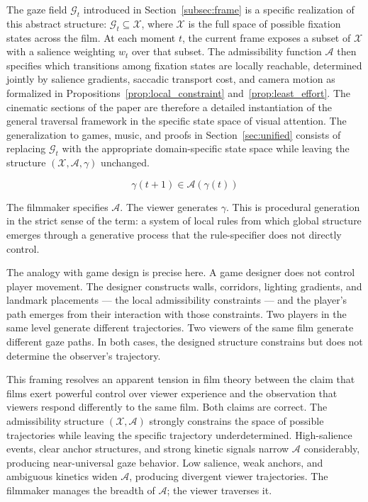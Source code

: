 \documentclass[12pt, a4paper]{article}
\theoremstyle{plain}
\theoremstyle{definition}
\theoremstyle{remark}
\newcommand{\X}{\mathcal{X}}
\newcommand{\A}{\mathcal{A}}
\newcommand{\G}{\mathcal{G}}
\newcommand{\traj}{\gamma}
\newcommand{\salience}{w}
\begin{document}
The gaze field $\G_t$ introduced in
Section~\ref{subsec:frame} is a specific realization of
this abstract structure: $\G_t \subseteq \X$, where $\X$ is
the full space of possible fixation states across the film.
At each moment $t$, the current frame exposes a subset of
$\X$ with a salience weighting $\salience_t$ over that
subset. The admissibility function $\A$ then specifies which
transitions among fixation states are locally reachable,
determined jointly by salience gradients, saccadic transport
cost, and camera motion as formalized in
Propositions~\ref{prop:local_constraint}
and~\ref{prop:least_effort}. The cinematic sections of the
paper are therefore a detailed instantiation of the general
traversal framework in the specific state space of visual
attention. The generalization to games, music, and proofs
in Section~\ref{sec:unified} consists of replacing $\G_t$
with the appropriate domain-specific state space while
leaving the structure $(\X, \A, \traj)$ unchanged.

\begin{equation}
  \traj(t+1) \in \A(\traj(t))
  \label{eq:trajectory_generation}
\end{equation}

The filmmaker specifies $\A$. The viewer generates $\traj$.
This is procedural generation in the strict sense of the
term: a system of local rules from which global structure
emerges through a generative process that the rule-specifier
does not directly control.

The analogy with game design is precise here. A game designer
does not control player movement. The designer constructs
walls, corridors, lighting gradients, and landmark
placements --- the local admissibility constraints --- and
the player's path emerges from their interaction with those
constraints. Two players in the same level generate
different trajectories. Two viewers of the same film generate
different gaze paths. In both cases, the designed structure
constrains but does not determine the observer's trajectory.

This framing resolves an apparent tension in film theory
between the claim that films exert powerful control over
viewer experience and the observation that viewers respond
differently to the same film. Both claims are correct. The
admissibility structure $(\X, \A)$ strongly constrains the
space of possible trajectories while leaving the specific
trajectory underdetermined. High-salience events, clear
anchor structures, and strong kinetic signals narrow $\A$
considerably, producing near-universal gaze behavior. Low
salience, weak anchors, and ambiguous kinetics widen $\A$,
producing divergent viewer trajectories. The filmmaker
manages the breadth of $\A$; the viewer traverses it.
\end{document}
